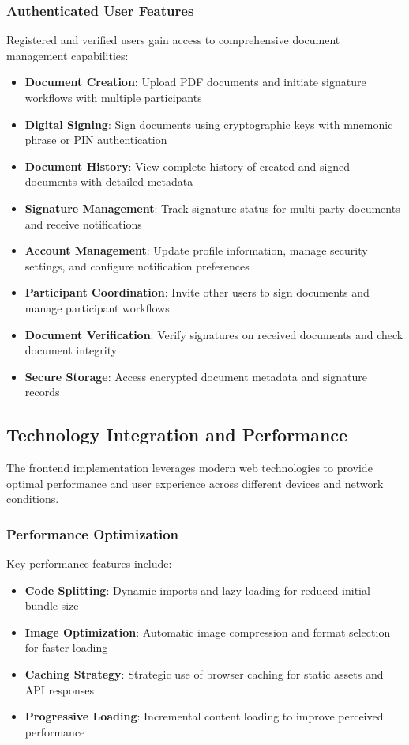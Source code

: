 \subsubsection{Authenticated User Features}
Registered and verified users gain access to comprehensive document management capabilities:

\begin{itemize}
    \item \textbf{Document Creation}: Upload PDF documents and initiate signature workflows with multiple participants
    \item \textbf{Digital Signing}: Sign documents using cryptographic keys with mnemonic phrase or PIN authentication
    \item \textbf{Document History}: View complete history of created and signed documents with detailed metadata
    \item \textbf{Signature Management}: Track signature status for multi-party documents and receive notifications
    \item \textbf{Account Management}: Update profile information, manage security settings, and configure notification preferences
    \item \textbf{Participant Coordination}: Invite other users to sign documents and manage participant workflows
    \item \textbf{Document Verification}: Verify signatures on received documents and check document integrity
    \item \textbf{Secure Storage}: Access encrypted document metadata and signature records
\end{itemize}

\subsection{Technology Integration and Performance}
The frontend implementation leverages modern web technologies to provide optimal performance and user experience across different devices and network conditions.

\subsubsection{Performance Optimization}
Key performance features include:
\begin{itemize}
    \item \textbf{Code Splitting}: Dynamic imports and lazy loading for reduced initial bundle size
    \item \textbf{Image Optimization}: Automatic image compression and format selection for faster loading
    \item \textbf{Caching Strategy}: Strategic use of browser caching for static assets and API responses
    \item \textbf{Progressive Loading}: Incremental content loading to improve perceived performance
\end{itemize}